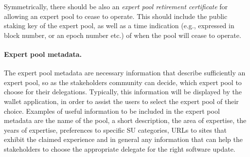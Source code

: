 Symmetrically, there should be also an \emph{expert pool retirement certificate} for allowing an expert pool to cease to operate. This should include the public staking key of the expert pool, as well as a time indication (e.g., expressed in block number, or an epoch number etc.) of when the pool will cease to operate.

\paragraph{Expert pool metadata.}
The expert pool metadata are necessary information that describe sufficiently an expert pool, so as the stakeholders community can decide, which expert pool to choose for their delegations. Typically, this information will be displayed by the wallet application, in order to assist the users to select the expert pool of their choice. Examples of useful information to be included in the expert pool metadata are the name of the pool, a short description, the area of expertise, the years of expertise, preferences to specific SU categories, URLs to sites that exhibit the claimed experience and in general any information that can help the stakeholders to choose the appropriate delegate for the right software update.


